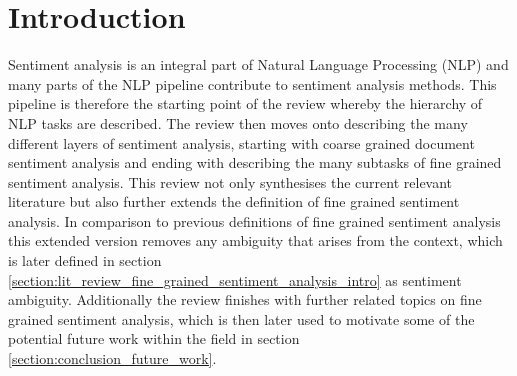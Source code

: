 \FloatBarrier
\section{Introduction}
Sentiment analysis is an integral part of Natural Language Processing (NLP) and many parts of the NLP pipeline contribute to sentiment analysis methods. This pipeline is therefore the starting point of the review whereby the hierarchy of NLP tasks are described. The review then moves onto describing the many different layers of sentiment analysis, starting with coarse grained document sentiment analysis and ending with describing the many subtasks of fine grained sentiment analysis. This review not only synthesises the current relevant literature but also further extends the definition of fine grained sentiment analysis. In comparison to previous definitions of fine grained sentiment analysis this extended version removes any ambiguity that arises from the context, which is later defined in section \ref{section:lit_review_fine_grained_sentiment_analysis_intro} as sentiment ambiguity. Additionally the review finishes with further related topics on fine grained sentiment analysis, which is then later used to motivate some of the potential future work within the field in section \ref{section:conclusion_future_work}.

